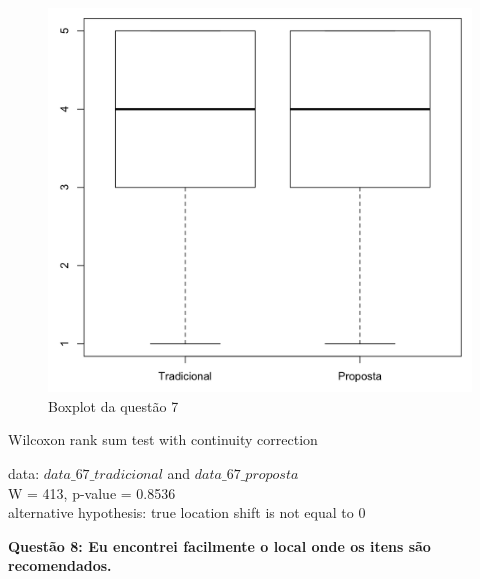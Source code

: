 \begin{figure}[htb]
  \caption{\label{fig:questao7-boxplot}Boxplot da questão 7}
  \begin{center}
      \includegraphics[scale=0.6]{./Figuras/questao7-boxplot.png}
  \end{center}
\end{figure}

Wilcoxon rank sum test with continuity correction

data:  $data\_67\_tradicional$ and $data\_67\_proposta$\\
W = 413, p-value = 0.8536\\
alternative hypothesis: true location shift is not equal to 0

\newpage
\textbf{Questão 8: Eu encontrei facilmente o local onde os itens são recomendados.}

